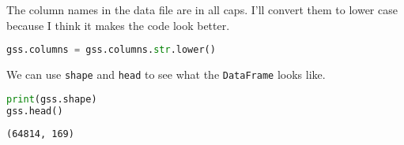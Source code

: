 The column names in the data file are in all caps. I'll convert them to
lower case because I think it makes the code look better.

\begin{lstlisting}[language=Python,style=source]
gss.columns = gss.columns.str.lower()
\end{lstlisting}

We can use \passthrough{\lstinline!shape!} and
\passthrough{\lstinline!head!} to see what the
\passthrough{\lstinline!DataFrame!} looks like.

\begin{lstlisting}[language=Python,style=source]
print(gss.shape)
gss.head()
\end{lstlisting}

\begin{lstlisting}[style=output]
(64814, 169)
\end{lstlisting}


